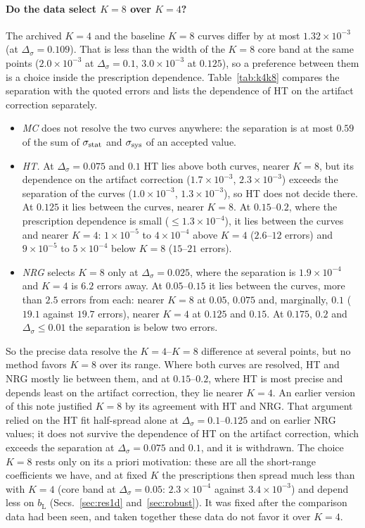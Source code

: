 \documentclass[11pt,a4paper]{article}
\numberwithin{equation}{section}
\newcommand{\Ds}{\Delta_\sigma}
\newcommand{\bL}{b_{\mathrm L}}
\newcommand{\sci}[2]{#1\times10^{#2}}
\begin{document}
\paragraph{Do the data select $K=8$ over $K=4$?} The archived $K=4$ and the baseline $K=8$
curves differ by at most $\sci{1.32}{-3}$ (at $\Ds=0.109$). That is less than the width of the
$K=8$ core band at the same points ($\sci{2.0}{-3}$ at $\Ds=0.1$, $\sci{3.0}{-3}$ at $0.125$), so a
preference between them is a choice inside the prescription dependence.
Table~\ref{tab:k4k8} compares the separation with the quoted errors and lists the dependence of
HT on the artifact correction separately.
\begin{itemize}
\item \emph{MC} does not resolve the two curves anywhere: the separation is at most $0.59$
of the sum of $\sigma_{\rm stat}$ and $\sigma_{\rm sys}$ of an accepted value.
\item \emph{HT.} At $\Ds=0.075$ and $0.1$ HT lies above both curves, nearer $K=8$, but its
dependence on the artifact correction ($\sci{1.7}{-3}$, $\sci{2.3}{-3}$) exceeds the separation of the curves
($\sci{1.0}{-3}$, $\sci{1.3}{-3}$), so HT does not decide there. At $0.125$ it lies between the
curves, nearer $K=8$. At $0.15$--$0.2$, where the prescription dependence is small
($\le\sci{1.3}{-4}$), it lies between the curves and nearer $K=4$: $\sci{1}{-5}$ to $\sci{4}{-4}$
above $K=4$ ($2.6$--$12$ errors) and $\sci{9}{-5}$ to $\sci{5}{-4}$ below $K=8$ ($15$--$21$ errors).
\item \emph{NRG} selects $K=8$ only at $\Ds=0.025$, where the separation is $\sci{1.9}{-4}$ and
$K=4$ is $6.2$ errors away. At $0.05$--$0.15$ it lies between the curves, more than $2.5$
errors from each: nearer $K=8$ at $0.05$, $0.075$ and, marginally, $0.1$ ($19.1$ against
$19.7$ errors), nearer $K=4$ at $0.125$ and $0.15$. At $0.175$, $0.2$ and $\Ds\le0.01$ the separation is below two errors.
\end{itemize}
So the precise data resolve the $K=4$--$K=8$ difference at several points, but no method
favors $K=8$ over its range. Where both curves are resolved, HT and NRG mostly lie between
them, and at $0.15$--$0.2$, where HT is most precise and depends least on the artifact
correction, they lie nearer $K=4$. An earlier version of this note justified $K=8$ by its
agreement with HT and NRG. That argument relied on the HT fit half-spread alone at
$\Ds=0.1$--$0.125$ and on earlier NRG values; it does not survive the dependence of HT on the
artifact correction, which exceeds the separation at $\Ds=0.075$ and $0.1$, and it is
withdrawn. The choice $K=8$ rests only on its a priori motivation: these are all the
short-range coefficients we have, and at fixed $K$ the prescriptions then spread much less
than with $K=4$ (core band at $\Ds=0.05$: $\sci{2.3}{-4}$ against $\sci{3.4}{-3}$) and depend
less on $\bL$ (Secs.~\ref{sec:res1d} and~\ref{sec:robust}). It was fixed after the comparison
data had been seen, and taken together these data do not favor it over $K=4$.
\end{document}
